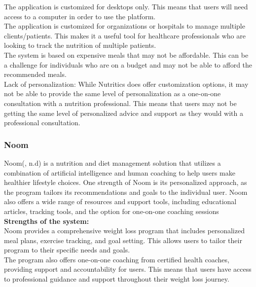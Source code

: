 \documentclass {article}
\begin{document}
\noindent The application is customized for desktops only. This means that users will need access to a computer in order to use the platform.\\

\noindent The application is customized for organizations or hospitals to manage multiple clients/patients. This makes it a useful tool for healthcare professionals who are looking to track the nutrition of multiple patients.\\

\noindent The system is based on expensive meals that may not be affordable. This can be a challenge for individuals who are on a budget and may not be able to afford the recommended meals.\\

\noindent Lack of personalization: While Nutritics does offer customization options, it may not be able to provide the same level of personalization as a one-on-one consultation with a nutrition professional. This means that users may not be getting the same level of personalized advice and support as they would with a professional consultation.\\

\subsubsection{Noom}
Noom(, n.d) is a nutrition and diet management solution that utilizes a combination of artificial intelligence and human coaching to help users make healthier lifestyle choices. One strength of Noom is its personalized approach, as the program tailors its recommendations and goals to the individual user. Noom also offers a wide range of resources and support tools, including educational articles, tracking tools, and the option for one-on-one coaching sessions\\

\noindent \textbf{Strengths of the system: \\}
\noindent Noom provides a comprehensive weight loss program that includes personalized meal plans, exercise tracking, and goal setting. This allows users to tailor their program to their specific needs and goals.\\

\noindent The program also offers one-on-one coaching from certified health coaches, providing support and accountability for users. This means that users have access to professional guidance and support throughout their weight loss journey.\\
\end{document}
